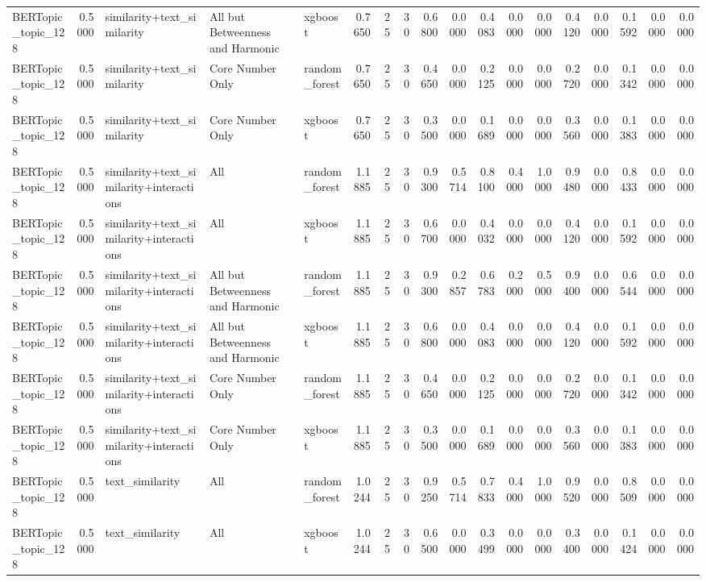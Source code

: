 \begin{tabular}{lrlllrrrrrrrrrrrrr}
BERTopic_topic_128 & 0.5000 & similarity+text_similarity & All but Betweenness and Harmonic & xgboost & 0.7650 & 25 & 30 & 0.6800 & 0.0000 & 0.4083 & 0.0000 & 0.0000 & 0.4120 & 0.0000 & 0.1592 & 0.0000 & 0.0000 \\
BERTopic_topic_128 & 0.5000 & similarity+text_similarity & Core Number Only & random_forest & 0.7650 & 25 & 30 & 0.4650 & 0.0000 & 0.2125 & 0.0000 & 0.0000 & 0.2720 & 0.0000 & 0.1342 & 0.0000 & 0.0000 \\
BERTopic_topic_128 & 0.5000 & similarity+text_similarity & Core Number Only & xgboost & 0.7650 & 25 & 30 & 0.3500 & 0.0000 & 0.1689 & 0.0000 & 0.0000 & 0.3560 & 0.0000 & 0.1383 & 0.0000 & 0.0000 \\
BERTopic_topic_128 & 0.5000 & similarity+text_similarity+interactions & All & random_forest & 1.1885 & 25 & 30 & 0.9300 & 0.5714 & 0.8100 & 0.4000 & 1.0000 & 0.9480 & 0.0000 & 0.8433 & 0.0000 & 0.0000 \\
BERTopic_topic_128 & 0.5000 & similarity+text_similarity+interactions & All & xgboost & 1.1885 & 25 & 30 & 0.6700 & 0.0000 & 0.4032 & 0.0000 & 0.0000 & 0.4120 & 0.0000 & 0.1592 & 0.0000 & 0.0000 \\
BERTopic_topic_128 & 0.5000 & similarity+text_similarity+interactions & All but Betweenness and Harmonic & random_forest & 1.1885 & 25 & 30 & 0.9300 & 0.2857 & 0.6783 & 0.2000 & 0.5000 & 0.9400 & 0.0000 & 0.6544 & 0.0000 & 0.0000 \\
BERTopic_topic_128 & 0.5000 & similarity+text_similarity+interactions & All but Betweenness and Harmonic & xgboost & 1.1885 & 25 & 30 & 0.6800 & 0.0000 & 0.4083 & 0.0000 & 0.0000 & 0.4120 & 0.0000 & 0.1592 & 0.0000 & 0.0000 \\
BERTopic_topic_128 & 0.5000 & similarity+text_similarity+interactions & Core Number Only & random_forest & 1.1885 & 25 & 30 & 0.4650 & 0.0000 & 0.2125 & 0.0000 & 0.0000 & 0.2720 & 0.0000 & 0.1342 & 0.0000 & 0.0000 \\
BERTopic_topic_128 & 0.5000 & similarity+text_similarity+interactions & Core Number Only & xgboost & 1.1885 & 25 & 30 & 0.3500 & 0.0000 & 0.1689 & 0.0000 & 0.0000 & 0.3560 & 0.0000 & 0.1383 & 0.0000 & 0.0000 \\
BERTopic_topic_128 & 0.5000 & text_similarity & All & random_forest & 1.0244 & 25 & 30 & 0.9250 & 0.5714 & 0.7833 & 0.4000 & 1.0000 & 0.9520 & 0.0000 & 0.8509 & 0.0000 & 0.0000 \\
BERTopic_topic_128 & 0.5000 & text_similarity & All & xgboost & 1.0244 & 25 & 30 & 0.6500 & 0.0000 & 0.3499 & 0.0000 & 0.0000 & 0.3400 & 0.0000 & 0.1424 & 0.0000 & 0.0000 \\

\end{tabular}
